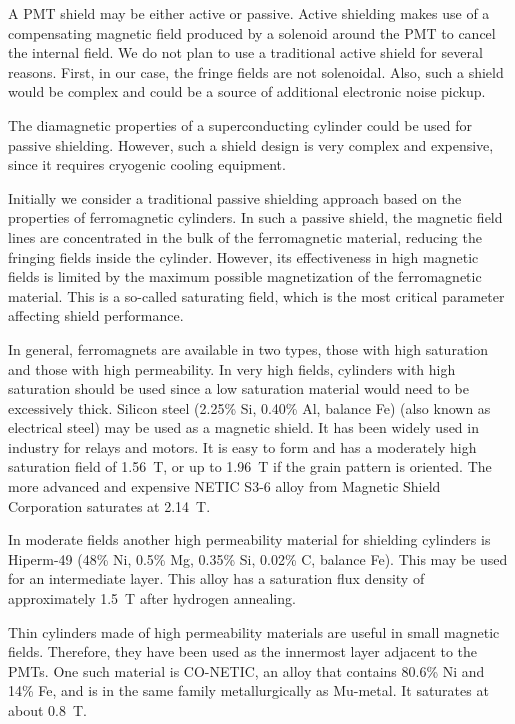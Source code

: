\documentclass[12pt]{article}
\begin{document}
A PMT shield may be either active or passive. Active shielding makes use of
a compensating magnetic field produced by a solenoid around the PMT to cancel the 
internal field. We do not plan to use a traditional active shield for several 
reasons. First, in our case, the fringe fields are not solenoidal. Also, such a
shield would be complex and could be a source of additional electronic noise pickup.

The diamagnetic properties of a superconducting cylinder could be used for 
passive shielding. However, such a shield design is very complex and expensive, 
since it requires cryogenic cooling equipment.

Initially we consider a traditional passive shielding approach based on the 
properties of ferromagnetic cylinders. In such a passive shield, the magnetic 
field lines are concentrated in the bulk of the ferromagnetic material, reducing 
the fringing fields inside the cylinder. However, its effectiveness in high magnetic 
fields is limited by the maximum possible magnetization of the ferromagnetic 
material. This is a so-called saturating field, which is the most critical parameter 
affecting shield performance. 

In general, ferromagnets are available in two types, those with high saturation and 
those with high permeability. In very  high fields, cylinders  with high saturation 
should be used since a low saturation material would need to be excessively thick. 
Silicon steel (2.25\% Si, 0.40\% Al, balance Fe) (also known as electrical steel) may 
be used as a magnetic shield. It has been widely used in industry for relays and motors. 
It is easy to form and has a moderately high saturation field of 1.56~T, or up to
1.96~T if the grain pattern is oriented. The more advanced and expensive NETIC S3-6 
alloy from Magnetic Shield Corporation saturates at 2.14~T.

In moderate fields another high permeability material for shielding cylinders is 
Hiperm-49 (48\% Ni, 0.5\% Mg, 0.35\% Si, 0.02\% C, balance Fe). This may be used for 
an intermediate layer. This alloy has a saturation flux density of approximately 
1.5~T after hydrogen annealing.

Thin cylinders made of high permeability materials are useful in small magnetic fields. 
Therefore, they have been used as the innermost layer adjacent to the PMTs. One such 
material is CO-NETIC, an alloy that contains 80.6\% Ni and 14\% Fe, and is in the same 
family metallurgically as Mu-metal. It saturates at about 0.8~T.
\end{document}
